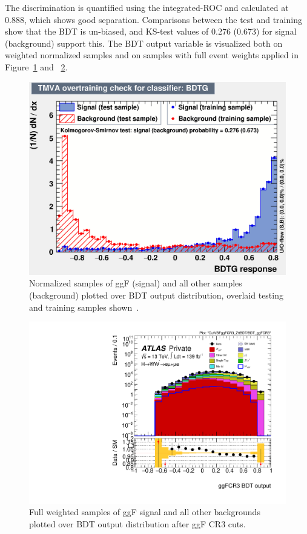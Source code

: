 The discrimination is quantified using the integrated-ROC and calculated at 0.888, which shows good separation. Comparisons between the test and training show that the BDT is un-biased, and KS-test values of 0.276 (0.673) for signal (background) support this. The BDT output variable is visualized both on weighted normalized samples and on samples with full event weights applied in Figure~\ref{fig:ggFCR3BDTresult} and ~\ref{fig:ggFCR3BDTresult2}.

\begin{figure}[!htbp]
\centering
  \includegraphics[width=.45\linewidth]{Pictures/ggFCR3/overtrain_BDTG.eps}
\caption{Normalized samples of ggF (signal) and all other samples (background) plotted over BDT output distribution, overlaid testing and training samples shown~\cite{ourSupportNote}.}
\label{fig:ggFCR3BDTresult}
\end{figure}

\begin{figure}[!htbp]
\centering
  \includegraphics[width=.45\linewidth]{Pictures/run2-emme-CutVBFggFCR3_ZttBDT-BDT_ggFCR3-log.pdf}
\caption{Full weighted samples of ggF signal and all other backgrounds plotted over BDT output distribution after ggF CR3 cuts.}
\label{fig:ggFCR3BDTresult2}
\end{figure}

\newpage
